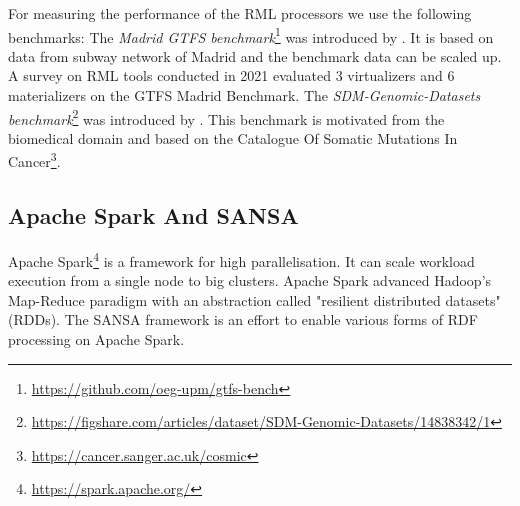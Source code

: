 For measuring the performance of the RML processors we use the following benchmarks:
The \emph{Madrid GTFS benchmark}\footnote{\url{https://github.com/oeg-upm/gtfs-bench}} was introduced by \cite{chaves2020gtfs}.
It is based on data from subway network of Madrid and the benchmark data can be scaled up.
A survey on RML tools\cite{ArenasGuerrero2021} conducted in 2021 evaluated 3 virtualizers and 6 materializers on the GTFS Madrid Benchmark.
The \emph{SDM-Genomic-Datasets benchmark}\footnote{\url{https://figshare.com/articles/dataset/SDM-Genomic-Datasets/14838342/1}} was introduced by \cite{Iglesias2020}.
This benchmark is motivated from the biomedical domain and based on the Catalogue Of Somatic Mutations In Cancer\footnote{\url{https://cancer.sanger.ac.uk/cosmic}}.
    






\subsection{Apache Spark And SANSA}
Apache Spark\footnote{\url{https://spark.apache.org/}} is a framework for high parallelisation. It can scale workload execution from a single node to big clusters. Apache Spark advanced Hadoop's Map-Reduce paradigm with an abstraction called "resilient distributed datasets" (RDDs).
The SANSA framework\cite{lehmann2017distributed} is an effort to enable various forms of RDF processing on Apache Spark.

